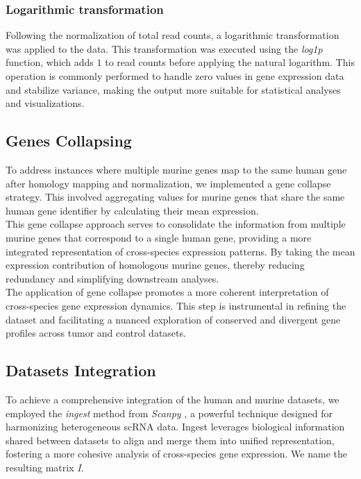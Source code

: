 \documentclass[10pt]{SelfArx} %
\begin{document}
\subsubsection{Logarithmic transformation}\label{sec:log_methods}
Following the normalization of total read counts, a logarithmic transformation was applied to the data. This transformation was executed using the \textit{log1p} function, which adds $1$ to read counts before applying the natural logarithm. This operation is commonly performed to handle zero values in gene expression data and stabilize variance, making the output more suitable for statistical analyses and visualizations. \\

\subsection{Genes Collapsing}\label{sec:gene_collapsing}
To address instances where multiple murine genes map to the same human gene after homology mapping and normalization, we implemented a gene collapse strategy. This involved aggregating values for murine genes that share the same human gene identifier by calculating their mean expression. \\
This gene collapse approach serves to consolidate the information from multiple murine genes that correspond to a single human gene, providing a more integrated representation of cross-species expression patterns. By taking the mean expression contribution of homologous murine genes, thereby reducing redundancy and simplifying downstream analyses. \\
The application of gene collapse promotes a more coherent interpretation of cross-species gene expression dynamics. This step is instrumental in refining the dataset and facilitating a nuanced exploration of conserved and divergent gene profiles across tumor and control datasets.

\subsection{Datasets Integration}\label{sec:integration_methods}
To achieve a comprehensive integration of the human and murine datasets, we employed the \textit{ingest} method from \textit{Scanpy} \cite{wolf2018scanpy}, a powerful technique designed for harmonizing heterogeneous scRNA data. Ingest leverages biological information shared between datasets to align and merge them into unified representation, fostering a more cohesive analysis of cross-species gene expression. 
We name the resulting matrix \textit{I}.
\end{document}
